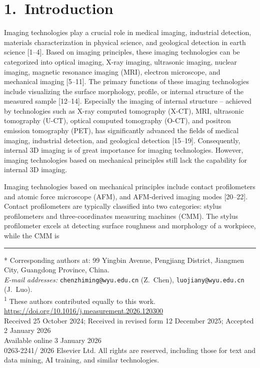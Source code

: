 \documentclass[11pt]{article}
\begin{document}
\section*{1.\ Introduction}

\noindent
Imaging technologies play a crucial role in medical imaging,
industrial detection, materials characterization in physical
science, and geological detection in earth science [1--4]. Based
on imaging principles, these imaging technologies can be
categorized into optical imaging, X-ray imaging, ultrasonic
imaging, nuclear imaging, magnetic resonance imaging (MRI),
electron microscope, and mechanical imaging [5--11]. The primary
functions of these imaging technologies include visualizing the
surface morphology, profile, or internal structure of the measured
sample [12--14]. Especially the imaging of internal structure --
achieved by technologies such as X-ray computed tomography (X-CT),
MRI, ultrasonic tomography (U-CT), optical computed tomography
(O-CT), and positron emission tomography (PET), has significantly
advanced the fields of medical imaging, industrial detection, and
geological detection [15--19]. Consequently, internal 3D imaging
is of great importance for imaging technologies. However, imaging
technologies based on mechanical principles still lack the
capability for internal 3D imaging.

Imaging technologies based on mechanical principles include
contact profilometers and atomic force microscope (AFM), and
AFM-derived imaging modes [20--22]. Contact profilometers are
typically classified into two categories: stylus profilometers
and three-coordinates measuring machines (CMM). The stylus
profilometer excels at detecting surface roughness and morphology
of a workpiece, while the CMM is

\vfill
\hrule
\vspace{0.4em}
\noindent
{\footnotesize
* Corresponding authors at: 99 Yingbin Avenue, Pengjiang District,
Jiangmen City, Guangdong Province, China.\\[2pt]
\textit{E-mail addresses:}
\texttt{chenzhiming@wyu.edu.cn} (Z.~Chen),
\texttt{luojiany@wyu.edu.cn} (J.~Luo).\\[2pt]
\textsuperscript{1} These authors contributed equally to this work.\\[4pt]
\url{https://doi.org/10.1016/j.measurement.2026.120300}\\[2pt]
Received 25 October 2024; Received in revised form 12 December
2025; Accepted 2 January 2026\\[2pt]
Available online 3 January 2026\\[2pt]
0263-2241/\textcopyright{} 2026 Elsevier Ltd. All rights are
reserved, including those for text and data mining, AI training,
and similar technologies.\par}
\end{document}
